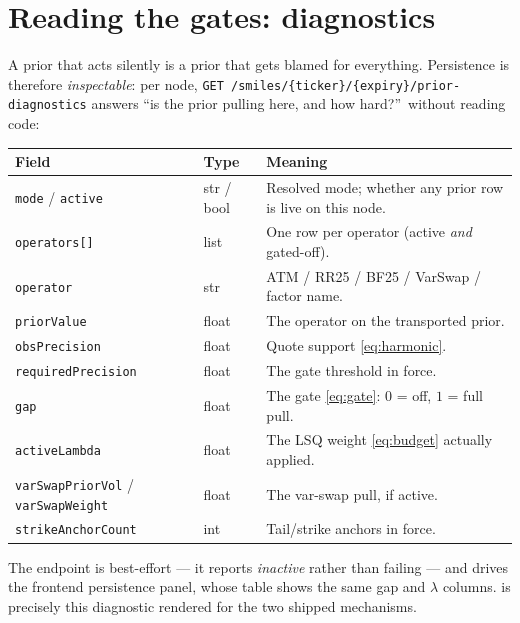 \documentclass[11pt]{article}
\begin{document}
\section{Reading the gates: diagnostics}
\label{sec:diagnostics}

A prior that acts silently is a prior that gets blamed for
everything.  Persistence is therefore \emph{inspectable}: per node,
\texttt{GET /smiles/\{ticker\}/\{expiry\}/prior-diagnostics} answers
``is the prior pulling here, and how hard?''\ without reading code:

\begin{center}
\small
\begin{tabular}{p{}lp{}}
\toprule
Field & Type & Meaning\\
\midrule
\texttt{mode} / \texttt{active} & str / bool & Resolved mode; whether
any prior row is live on this node.\\
\texttt{operators[]} & list & One row per operator (active \emph{and}
gated-off).\\
\quad\texttt{operator} & str & ATM / RR25 / BF25 / VarSwap / factor
name.\\
\quad\texttt{priorValue} & float & The operator on the transported
prior.\\
\quad\texttt{obsPrecision} & float & Quote support
\eqref{eq:harmonic}.\\
\quad\texttt{requiredPrecision} & float & The gate threshold in
force.\\
\quad\texttt{gap} & float & The gate \eqref{eq:gate}: $0$ = off, $1$ =
full pull.\\
\quad\texttt{activeLambda} & float & The LSQ weight \eqref{eq:budget}
actually applied.\\
\texttt{varSwapPriorVol} / \texttt{varSwapWeight} & float & The
var-swap pull, if active.\\
\texttt{strikeAnchorCount} & int & Tail/strike anchors in force.\\
\bottomrule
\end{tabular}
\end{center}

The endpoint is best-effort --- it reports \emph{inactive} rather than
failing --- and drives the frontend persistence panel, whose table
shows the same gap and $\lambda$ columns.   is
precisely this diagnostic rendered for the two shipped mechanisms.

\end{document}
